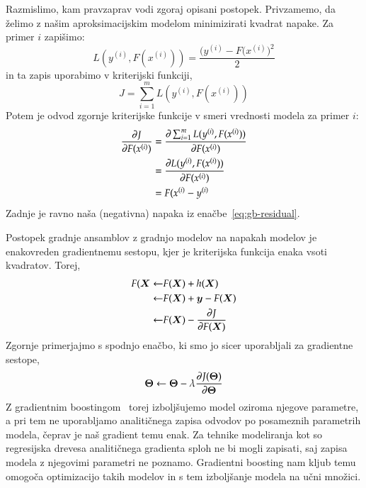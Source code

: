 Razmislimo, kam pravzaprav vodi zgoraj opisani postopek. Privzamemo, da želimo z našim aproksimacijskim modelom minimizirati kvadrat napake. Za primer $i$ zapišimo:
\begin{equation}
  \nonumber
  L(y^{(i)},F(x^{(i)}))=\frac{\big(y^{(i)}-F(x^{(i)}\big)^2}{2}
\end{equation}
in ta zapis uporabimo v kriterijski funkciji,
\begin{equation}
  \nonumber
  J = \sum_{i=1}^m L(y^{(i)},F(x^{(i)}))
\end{equation}
Potem je odvod zgornje kriterijske funkcije v smeri vrednosti modela za primer $i$:
\begin{equation}
  \nonumber
  \begin{split}
    \frac{\partial J}{\partial F(x^{(i)})} & = \frac{\partial\sum_{i=1}^m L(y^{(i)},F(x^{(i)}))}{\partial F(x^{(i)})} \\
    & = \frac{\partial L(y^{(i)},F(x^{(i)}))}{\partial F(x^{(i)})} \\
    & = F(x^{(i)}-y^{(i)}
  \end{split}
\end{equation}
Zadnje je ravno naša (negativna) napaka iz enačbe~\ref{eq:gb-residual}.

Postopek gradnje ansamblov z gradnjo modelov na napakah modelov je enakovreden gradientnemu sestopu, kjer je kriterijska funkcija enaka vsoti kvadratov. Torej,
\begin{equation}
  \nonumber
  \begin{split}
    F({\bm X} \leftarrow & F({\bm X}) + h({\bm X}) \\
    \leftarrow & F({\bm X}) + {\bm y} - F({\bm X}) \\
    \leftarrow & F({\bm X}) - \frac{\partial J}{\partial F({\bm X})}
  \end{split}
\end{equation}
Zgornje primerjajmo s spodnjo enačbo, ki smo jo sicer uporabljali za gradientne sestope,
\begin{equation}
  \nonumber
  {\bm\Theta} \leftarrow {\bm\Theta}-\lambda\frac{\partial J({\bm\Theta})}{\partial\bm\Theta}
\end{equation}
Z gradientnim boostingom~\cite{Friedman2001} torej izboljšujemo model oziroma njegove parametre, a pri tem ne uporabljamo analitičnega zapisa odvodov po posameznih parametrih modela, čeprav je naš gradient temu enak. Za tehnike modeliranja kot so regresijska drevesa analitičnega gradienta sploh ne bi mogli zapisati, saj zapisa modela z njegovimi parametri ne poznamo. Gradientni boosting nam kljub temu omogoča optimizacijo takih modelov in s tem izboljšanje modela na učni množici.

